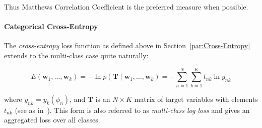 Thus Matthews Correlation Coefficient is the preferred measure when possible.


\paragraph{Categorical Cross-Entropy}
\label{par:Categorical Cross-Entropy}

The \emph{cross-entropy} loss function as defined above in Section~\ref{par:Cross-Entropy} extends to the multi-class case quite naturally:

\begin{equation}
  E(\mathbf{w}_1, \ldots, \mathbf{w}_k) = -\ln p(\mathbf{T} \mid \mathbf{w}_1, \ldots, \mathbf{w}_k) = - \sum_{n=1}^N \sum_{k=1}^K t_{nk} \ln y_{nk}
\end{equation}

where $y_{nk} = y_k (\phi_n)$, and $\mathbf{T}$ is an  $N \times K$ matrix of target variables with elements $t_{nk}$ (see as in~\cite[Chapter 4.3.4, p.~209 ]{Bishop:2006aa}). This form is also referred to as \emph{multi-class log loss} and gives an aggregated loss over all classes.
